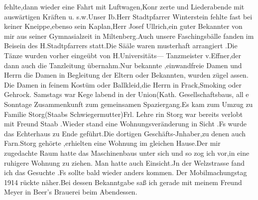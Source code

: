 \documentclass[a4paper,11pt]{article}
\begin{document}
   fehlte,dann wieder eine Fahrt mit Luftwagen,Konr zerte und Liederabende mit auswärtigen Kräften u. s.w.Unser Ib.Herr Stadtpfarrer Winterstein fehlte fast bei keiner Kneippe,ebenso sein Kaplan,Herr Josef Ullrich,ein guter Bekannter von mir aus seiner Gymnasialzeit in Miltenberg.Auch unsere Faschingsbälle fanden im Beisein des H.Stadtpfarrers statt.Die Sääle waren musterhaft arrangiert .Die Tänze wurden vorher eingeübt von H.Universitäts— Tanzmeister v.Effner,der dann auch die Tanzleitung übernahm.Nur bekannte ,einwandfreie Damen und Herrn die Damen in Begleitung der Eltern oder Bekannten, wurden zügel assen. Die Damen in feinem Kostüm oder Ballkleid,die Herrn in Frack,Smoking oder Gehrock. Samstags war Kege labend in der Union(Kath. Gesellschaftsbaus, all e Sonntage Zusammenkunft zum gemeinsamen Spaziergang.Es kam zum Umzug zu Familie Storg(Staabs Schwiegermutter)Frl. Lehre rin Storg war bereits verlobt mit Freund Staab .Wieder stand eine Wohnungsveränderung in Sicht .Fs wurde das Echterhaus zu Ende geführt.Die dortigen Geschäfts-Jnhaber,zu denen auch Farn.Storg gehörte ,erhielten eine Wohnung im gleichen Hause.Der mir zugedachte Raum hatte das Maschinenbaus unter sich und so zog ich vor,in eine ruhigere Wohnung zu ziehen. Man hatte auch Einsicht.Jn der Welzstrasse fand ich das Gesuchte .Fs sollte bald wieder anders kommen. Der Mobilmachungstag 1914 rückte näher.Bei dessen Bekanntgabe saß ich gerade mit meinem Freund Meyer in Beer’s Brauerei beim Abendessen.
\end{document}
